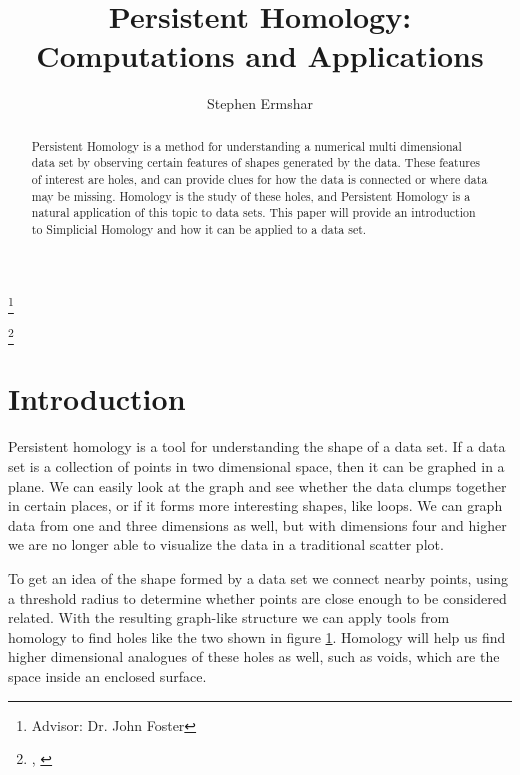 

\title[Persistent Homology]{Persistent Homology: Computations and Applications}
\author{Stephen Ermshar}
\address{Department of Mathematics, Walla Walla University, College Place, WA 99324}
\date{} %
\thanks{Advisor: Dr. John Foster}

\thanks{\tiny{\DTMtoday, \DTMcurrenttime}}
\rfoot{\hfill\newline\tiny{\DTMtoday, \DTMcurrenttime}}




\begin{abstract}
    Persistent Homology is a method for understanding a numerical multi dimensional data set by observing certain features of shapes generated by the data.
    These features of interest are holes, and can provide clues for how the data is connected or where data may be missing.
    Homology is the study of these holes, and Persistent Homology is a natural application of this topic to data sets.
    This paper will provide an introduction to Simplicial Homology and how it can be applied to a data set.
\end{abstract}
\maketitle

\section{Introduction}


Persistent homology is a tool for understanding the shape of a data set.
If a data set is a collection of points in two dimensional space, then it can be graphed in a plane.
We can easily look at the graph and see whether the data clumps together in certain places, or if it forms more interesting shapes, like loops.
We can graph data from one and three dimensions as well, but with dimensions four and higher we are no longer able to visualize the data in a traditional scatter plot.

\begin{figure}[h]
    \centering
    \scalebox{0.75}{}
    \caption{}
    \label{fig:persistence-demo-r25}
\end{figure}

To get an idea of the shape formed by a data set we connect nearby points, using a threshold radius to determine whether points are close enough to be considered related.
With the resulting graph-like structure we can apply tools from homology to find holes like the two shown in figure \ref{fig:persistence-demo-r25}.
Homology will help us find higher dimensional analogues of these holes as well, such as voids, which are the space inside an enclosed surface.

